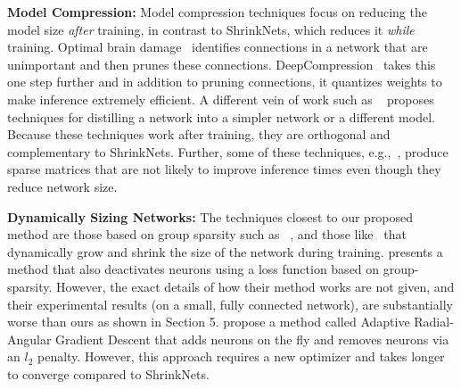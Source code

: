 
\noindent\textbf{Model Compression: }Model compression techniques focus on
reducing the model size \emph{after} training, in contrast to ShrinkNets, which
reduces it \emph{while} training. 
Optimal brain damage~\cite{Cun} identifies connections in a network that are
unimportant and then prunes these connections.
DeepCompression~\cite{han2015deepcompression} takes this one step further and in
addition to pruning connections, it quantizes weights to make inference
extremely efficient.  A different vein of work such as ~\cite{romero2014fitnets,
hinton2015distilling} proposes techniques for distilling a network into a
simpler network or a different model. Because these techniques work after
training, they are orthogonal and complementary to ShrinkNets. Further,
some of these techniques, e.g.,~\cite{Han2015,Cun}, produce sparse matrices that
are not likely to improve inference times even though they reduce network size.



\noindent\textbf{Dynamically Sizing Networks: }The techniques closest to our
proposed method are those based on group sparsity such as
~\cite{Scardapane2017}, and those like~\cite{Philipp} that dynamically grow and shrink
 the size of the network during training.  \cite{Scardapane2017}
presents a method that also deactivates neurons using a loss function based on
group-sparsity.  However, the exact details of how their method works are not
given, and their experimental results (on a small, fully connected network), are
substantially worse than ours as shown in Section 5.
\cite{Philipp} propose a method called Adaptive Radial-Angular Gradient Descent
that adds neurons on the fly and removes neurons via an $l_2$ penalty.  However,
this approach requires a new optimizer and takes longer to converge compared to
ShrinkNets.




